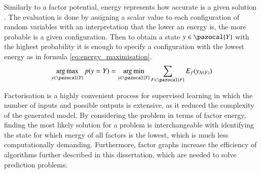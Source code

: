 Similarly to a factor potential, energy represents how accurate is a given solution \cite{factor_graphs_chopra}. The evaluation is done by assigning a scalar value to each configuration of random variables with an interpretation that the lower an energy is, the more probable is a given configuration. Then to obtain a state $y \in \pazocal{Y}$ with the highest probability it is enough to specify a configuration with the lowest energy as in formula \ref{eq:energy_maximisation}.
\begin{equation}
    \label{eq:energy_maximisation}
    \argmax_{y \in \pazocal{Y}}{p(y=Y)} = \argmin_{y \in \pazocal{Y}} \sum_{F\in \pazocal{F}} {E_f}({y_{N(F)}})
\end{equation}

Factorisation is a highly convenient process for supervised learning in which the number of inputs and possible outputs is extensive, as it reduced the complexity of the generated model. By considering the problem in terms of factor energy, finding the most likely solution for a problem is interchangeable with identifying the state for which energy of all factors is the lowest, which is much less computationally demanding. Furthermore, factor graphs increase the efficiency of algorithms further described in this dissertation, which are needed to solve prediction problems. 